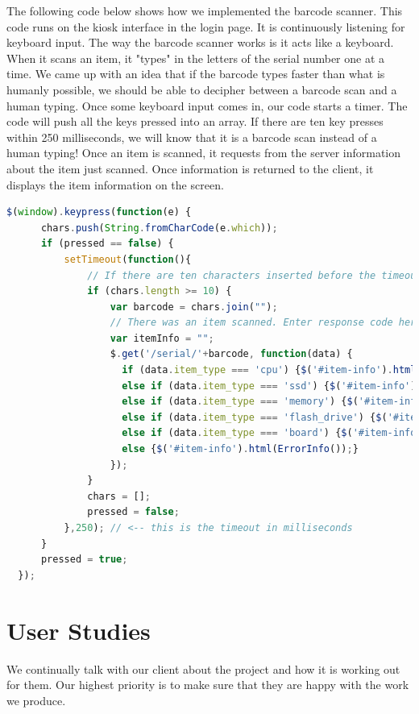 \documentclass[10pt, onecolumn, twoside, peerreview]{IEEEtran}
\begin{document}
The following code below shows how we implemented the barcode scanner. This
code runs on the kiosk interface in the login page. It is continuously
listening for keyboard input. The way the barcode scanner works is it acts like
a keyboard. When it scans an item, it "types" in the letters of the serial
number one at a time. We came up with an idea that if the barcode types faster
than what is humanly possible, we should be able to decipher between a barcode
scan and a human typing. Once some keyboard input comes in, our code starts a
timer. The code will push all the keys pressed into an array. If there are ten
key presses within 250 milliseconds, we will know that it is a barcode scan
instead of a human typing! Once an item is scanned, it requests from the server
information about the item just scanned. Once information is returned to the
client, it displays the item information on the screen.
\begin{lstlisting}[language=Javascript, caption=Barcode Scanner Listener]
$(window).keypress(function(e) {
      chars.push(String.fromCharCode(e.which));
      if (pressed == false) {
          setTimeout(function(){
              // If there are ten characters inserted before the timeout
              if (chars.length >= 10) {
                  var barcode = chars.join("");
                  // There was an item scanned. Enter response code here.
                  var itemInfo = "";
                  $.get('/serial/'+barcode, function(data) {
                    if (data.item_type === 'cpu') {$('#item-info').html(CPUInfo(data));}
                    else if (data.item_type === 'ssd') {$('#item-info').html(SSDInfo(data));}
                    else if (data.item_type === 'memory') {$('#item-info').html(MemoryInfo(data));}
                    else if (data.item_type === 'flash_drive') {$('#item-info').html(FlashDriveInfo(data));}
                    else if (data.item_type === 'board') {$('#item-info').html(BoardInfo(data));}
                    else {$('#item-info').html(ErrorInfo());}
                  });
              }
              chars = [];
              pressed = false;
          },250); // <-- this is the timeout in milliseconds
      }
      pressed = true;
  });
\end{lstlisting}

\section{User Studies}
We continually talk with our client about the project and how it is working out
for them. Our highest priority is to make sure that they are happy with the
work we produce.\\
\end{document}
